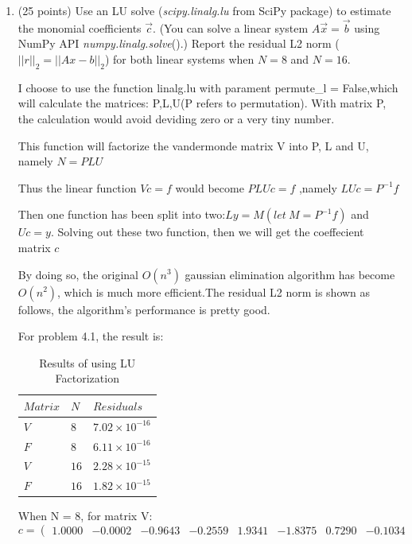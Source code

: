 \documentclass[10pt]{article}
\begin{document}
\begin{enumerate}[label=3.\arabic*]
    \item (25 points) \label{q:3.1}
    Use an LU solve (\textit{scipy.linalg.lu} from SciPy package) to estimate the monomial coefficients $\vec{c}$. (You can solve a linear system $A
    \vec{x}=\vec{b}$ using NumPy API \textit{numpy.linalg.solve}().)
    Report the residual L2 norm ($||r||_2=||Ax-b||_2$) for both linear systems when $N = 8$ and $N = 16$.\par
    I choose to use the function linalg.lu with parament permute\_l = False,which will calculate the matrices: P,L,U(P refers to permutation). With matrix P, the calculation would avoid deviding zero or a very tiny number.\par
    This function will factorize the vandermonde matrix V into P, L and U, namely $N=PLU$\par
    Thus the linear function $Vc=f$ would become $PLUc=f$ ,namely $LUc=P^{-1}f$\par
    Then one function has been split into two:$Ly=M(let\ M = P^{-1}f)$ and $Uc=y$. Solving out these two function, then we will get the coeffecient matrix $c$\par
    By doing so, the original $O(n^3)$ gaussian elimination algorithm has become $O(n^2)$, which is much more efficient.The residual L2 norm is shown as follows, the algorithm's performance is pretty good.\par 
    	For problem 4.1, the result is:\par
    \begin{table}[H]
    	\centering
    	\begin{tabular}{|l|l|l|}
    		\hline
    		$Matrix$& $N$ & $Residuals$  \\ \hline
    		$V$& $8$ & $7.02\times 10^{-16}$  \\ \hline
    		$F$& $8$ & $6.11\times 10^{-16}$ \\ \hline
    		$V$& $16$ & $2.28\times 10^{-15}$  \\ \hline
    		$F$& $16$ & $1.82\times 10^{-15}$ \\ \hline
    	\end{tabular}
    	\caption{Results of using LU Factorization}
    \end{table}
    When N = 8, for matrix V: 
    \begin{equation}      
    c=\left(                 
    \begin{array}{cccccccc}
    1.0000&-0.0002&-0.9643&-0.2559&1.9341&-1.8375&0.7290&-0.1034

\end{array}
\end{equation}
\end{enumerate}
\end{document}
